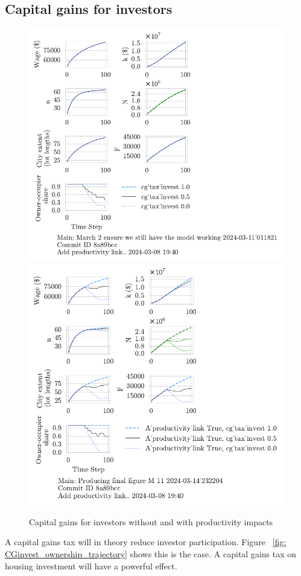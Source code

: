 \subsection{Capital gains for investors}
\begin{figure}[h!tb] 
    \centering
    \includegraphics[scale=.75, trim={0 1.4cm 4.5cm 0},clip]{fig/cg_tax_invest-Main-011821.pdf} 
    \includegraphics[scale=.75, trim={0 1.4cm 3.7cm 0},clip]{fig/With-productivity_linkcg_tax_invest-232204.pdf} 
    \caption{Capital gains for investors without and with productivity impacts}
    \label{fig:CG-invest_link_W-WO-Cost-of-capital}
\end{figure}
 A capital gains tax will in theory reduce investor participation. Figure ~\ref{fig: CGinvest_ownership_trajectory} shows this is the case. A capital gains tax on housing investment will have a powerful effect.

